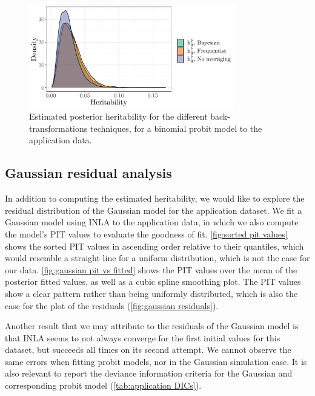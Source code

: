 \begin{figure}
    \centering
        \includegraphics[width=0.8\textwidth]{figures/qgglmm-comparison-application.pdf}       
    \caption[$h^2_\Psi$ on application data, with varying parameter settings]{Estimated posterior heritability for the different back-transformations techniques, for a binomial probit model to the application data.}
    \label{fig:qgglmm application}
\end{figure}
\subsection{Gaussian residual analysis}
In addition to computing the estimated heritability, we would like to explore the residual distribution of the Gaussian model for the application dataset. We fit a Gaussian model using INLA to the application data, in which we also compute the model's PIT values to evaluate the goodness of fit. \autoref{fig:sorted pit values} shows the sorted PIT values in ascending order relative to their quantiles, which would resemble a straight line for a uniform distribution, which is not the case for our data. \autoref{fig:gaussian pit vs fitted} shows the PIT values over the mean of the posterior fitted values, as well as a cubic spline smoothing plot. The PIT values show a clear pattern rather than being uniformly distributed, which is also the case for the plot of the residuals (\autoref{fig:gaussian residuals}).

Another result that we may attribute to the residuals of the Gaussian model is that INLA seems to not always converge for the first initial values for this dataset, but succeeds all times on its second attempt. We cannot observe the same errors when fitting probit models, nor in the Gaussian simulation case. It is also relevant to report the deviance information criteria for the Gaussian and corresponding probit model (\autoref{tab:application DICs}).


